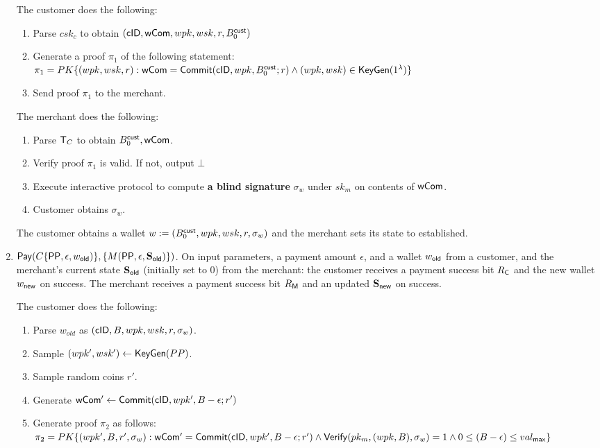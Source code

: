 \documentclass[11pt]{report}
\newcommand{\BC}{B^{\text{\sf cust}}_{\text{0}}}
\begin{document}
\begin{enumerate}
\medskip \noindent
The customer does the following:
\begin{enumerate}
\item Parse $csk_c$ to obtain $({\sf cID}, {\sf wCom}, wpk, wsk, r, \BC)$
\item Generate a proof $\pi_1$ of the following statement: \\
$\pi_1 = PK\{ (wpk, wsk, r) : {\sf wCom} = {\sf Commit}({\sf cID}, wpk, \BC; r) \wedge (wpk, wsk) \in {\sf KeyGen}(1^\lambda)\}$
\item Send proof $\pi_1$ to the merchant.
\end{enumerate}

\medskip \noindent
The merchant does the following:
\begin{enumerate}
\item Parse ${\sf T}_{C}$ to obtain $\BC, {\sf wCom}$.
\item Verify proof $\pi_1$ is valid. If not, output $\bot$
\item Execute interactive protocol to compute {\bf a blind signature} $\sigma_w$ under $sk_m$ on contents of ${\sf wCom}$.
\item Customer obtains $\sigma_w$.
\end{enumerate}

\medskip \noindent
The customer obtains a wallet $w := (\BC, wpk, wsk, r, \sigma_w)$ and the merchant sets its state to {\sf established}.


\item ${\sf Pay}( C\{{\sf PP}, \epsilon, w_{\sf old})\}, \{M({\sf PP}, \epsilon, {\bf S}_{\sf old})\})$. On input parameters, a payment amount $\epsilon$, and a wallet $w_{\sf old}$ from a customer, and the merchant's current state ${\bf S}_{\sf old}$ (initially set to $0$) from the merchant: the customer receives a payment success bit $R_{\sf C}$ and the new wallet $w_{\sf new}$ on success. The merchant receives a payment success bit $R_{\sf M}$ and an updated ${\bf S}_{\sf new}$ on success.

\medskip \noindent
The customer does the following:
\begin{enumerate}
\item Parse $w_{old}$ as $({\sf cID}, B, wpk, wsk, r, \sigma_w)$.
\item Sample $(wpk', wsk') \leftarrow {\sf KeyGen}(PP)$.
\item Sample random coins $r'$.
\item Generate ${\sf wCom'} \leftarrow {\sf Commit}({\sf cID}, wpk', B - \epsilon; r')$
\item Generate proof $\pi_2$ as follows:
\\ $\pi_2 = PK\{ (wpk', B, r', \sigma_w) : {\sf wCom'} = {\sf Commit}({\sf cID}, wpk', B - \epsilon; r') 
\\ \wedge {\sf Verify}(pk_m, (wpk, B), \sigma_w) = 1
\\ \wedge 0 \leq (B - \epsilon) \leq val_{\sf max} \}$


\end{enumerate}
\end{enumerate}
\end{document}
